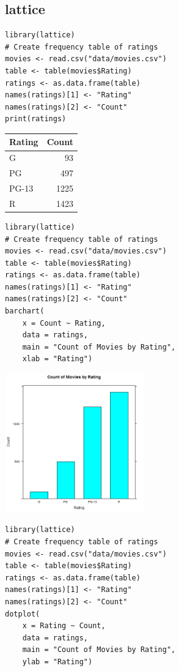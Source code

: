 \documentclass[a4paper, captions=tableheading]{tufte-book}
\begin{document}
\subsection{lattice}
\label{sec:orgheadline4}

\begin{verbatim}
library(lattice)
# Create frequency table of ratings
movies <- read.csv("data/movies.csv")
table <- table(movies$Rating)
ratings <- as.data.frame(table)
names(ratings)[1] <- "Rating"
names(ratings)[2] <- "Count"
print(ratings)
\end{verbatim}

\begin{center}
\begin{tabular}{lr}
\toprule
Rating & Count\\
\midrule
G & 93\\
PG & 497\\
PG-13 & 1225\\
R & 1423\\
\bottomrule
\end{tabular}
\end{center}

\begin{verbatim}
library(lattice)
# Create frequency table of ratings
movies <- read.csv("data/movies.csv")
table <- table(movies$Rating)
ratings <- as.data.frame(table)
names(ratings)[1] <- "Rating"
names(ratings)[2] <- "Count"
barchart(
	x = Count ~ Rating,
	data = ratings,
	main = "Count of Movies by Rating",
	xlab = "Rating")
\end{verbatim}

\includegraphics[height=6cm]{img/1-cat-lattice-01.png}

\begin{verbatim}
library(lattice)
# Create frequency table of ratings
movies <- read.csv("data/movies.csv")
table <- table(movies$Rating)
ratings <- as.data.frame(table)
names(ratings)[1] <- "Rating"
names(ratings)[2] <- "Count"
dotplot(
	x = Rating ~ Count,
	data = ratings,
	main = "Count of Movies by Rating",
	ylab = "Rating")
\end{verbatim}
\end{document}
